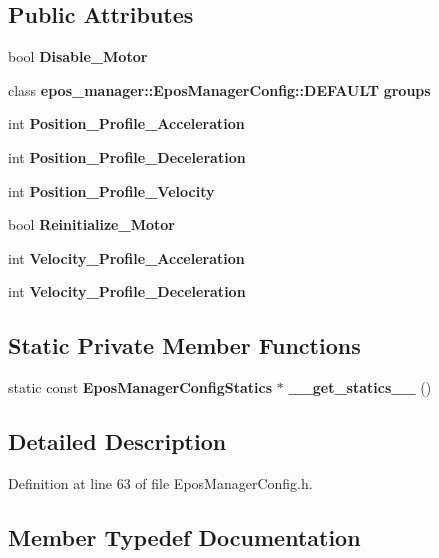 \subsection*{\-Public \-Attributes}
\begin{DoxyCompactItemize}
\item 
bool {\bf \-Disable\-\_\-\-Motor}
\item 
class \*
{\bf epos\-\_\-manager\-::\-Epos\-Manager\-Config\-::\-D\-E\-F\-A\-U\-L\-T} {\bf groups}
\item 
int {\bf \-Position\-\_\-\-Profile\-\_\-\-Acceleration}
\item 
int {\bf \-Position\-\_\-\-Profile\-\_\-\-Deceleration}
\item 
int {\bf \-Position\-\_\-\-Profile\-\_\-\-Velocity}
\item 
bool {\bf \-Reinitialize\-\_\-\-Motor}
\item 
int {\bf \-Velocity\-\_\-\-Profile\-\_\-\-Acceleration}
\item 
int {\bf \-Velocity\-\_\-\-Profile\-\_\-\-Deceleration}
\end{DoxyCompactItemize}
\subsection*{\-Static \-Private \-Member \-Functions}
\begin{DoxyCompactItemize}
\item 
static const \*
{\bf \-Epos\-Manager\-Config\-Statics} $\ast$ {\bf \-\_\-\-\_\-get\-\_\-statics\-\_\-\-\_\-} ()
\end{DoxyCompactItemize}


\subsection{\-Detailed \-Description}


\-Definition at line 63 of file \-Epos\-Manager\-Config.\-h.



\subsection{\-Member \-Typedef \-Documentation}
